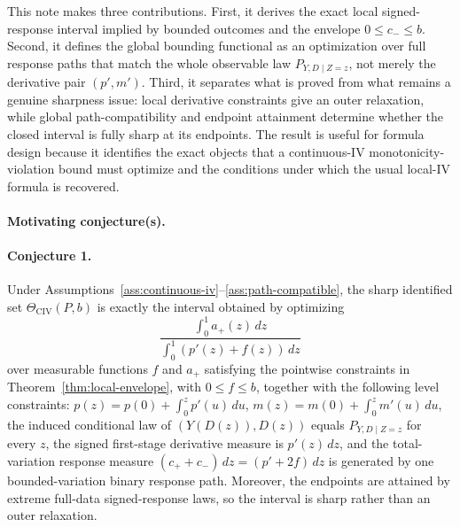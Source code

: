 \documentclass[11pt]{article}
\theoremstyle{definition}
\theoremstyle{plain}
\theoremstyle{remark}
\begin{document}
This note makes three contributions.  First, it derives the exact local
signed-response interval implied by bounded outcomes and the envelope
\(0\le c_-\le b\).  Second, it defines the global bounding functional as an
optimization over full response paths that match the whole observable law
\(P_{Y,D\mid Z=z}\), not merely the derivative pair \((p',m')\).  Third, it
separates what is proved from what remains a genuine sharpness issue:
local derivative constraints give an outer relaxation, while global
path-compatibility and endpoint attainment determine whether the closed
interval is fully sharp at its endpoints.  The result is useful for formula
design because it identifies the exact objects that a continuous-IV
monotonicity-violation bound must optimize and the conditions under which the
usual local-IV formula is recovered.

\paragraph{Motivating conjecture(s).}
\paragraph{Conjecture 1.}\label{conj:sharp-pasting}
Under Assumptions~\ref{ass:continuous-iv}--\ref{ass:path-compatible}, the sharp identified set \(\Theta_{\mathrm{CIV}}(P,b)\) is exactly the interval obtained by optimizing
\[
\frac{\int_0^1 a_+(z)\,dz}{\int_0^1 (p'(z)+f(z))\,dz}
\]
over measurable functions \(f\) and \(a_+\) satisfying the pointwise constraints in Theorem~\ref{thm:local-envelope}, with \(0\le f\le b\), together with the following level constraints: \(p(z)=p(0)+\int_0^z p'(u)\,du\), \(m(z)=m(0)+\int_0^z m'(u)\,du\), the induced conditional law of \((Y(D(z)),D(z))\) equals \(P_{Y,D\mid Z=z}\) for every \(z\), the signed first-stage derivative measure is \(p'(z)\,dz\), and the total-variation response measure \((c_++c_-)\,dz=(p'+2f)\,dz\) is generated by one bounded-variation binary response path.  Moreover, the endpoints are attained by extreme full-data signed-response laws, so the interval is sharp rather than an outer relaxation.
\end{document}
